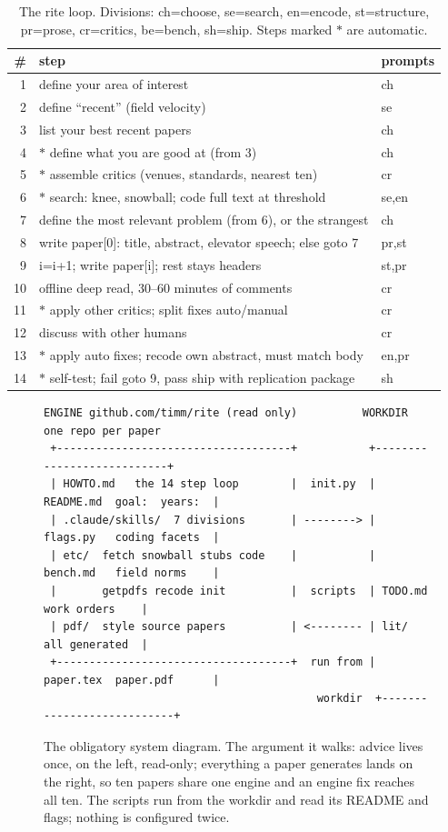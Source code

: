 \begin{table}
\caption{The rite loop. Divisions: ch=choose, se=search,
en=encode, st=structure, pr=prose, cr=critics, be=bench, sh=ship.
Steps marked $\ast$ are automatic.}
\label{tab:loop}
\small
\begin{tabular}{rlp{0.9cm}}
\toprule
\# & step & prompts\\
\midrule
1 & define your area of interest & ch\\
2 & define ``recent'' (field velocity) & se\\
3 & list your best recent papers & ch\\
4 & $\ast$ define what you are good at (from 3) & ch\\
5 & $\ast$ assemble critics (venues, standards,
    nearest ten) & cr\\
6 & $\ast$ search: knee, snowball; code full text
    at threshold & se,en\\
7 & define the most relevant problem (from 6),
    or the strangest & ch\\
8 & write paper[0]: title, abstract, elevator
    speech; else goto 7 & pr,st\\
9 & i=i+1; write paper[i]; rest stays headers & st,pr\\
10 & offline deep read, 30--60 minutes of
    comments & cr\\
11 & $\ast$ apply other critics; split fixes
    auto/manual & cr\\
12 & discuss with other humans & cr\\
13 & $\ast$ apply auto fixes; recode own abstract,
    must match body & en,pr\\
14 & $\ast$ self-test; fail goto 9, pass ship with
    replication package & sh\\
\bottomrule
\end{tabular}
\end{table}

\begin{figure}
\centering
\begin{BVerbatim}[fontsize=\scriptsize]
 ENGINE github.com/timm/rite (read only)          WORKDIR one repo per paper
 +------------------------------------+           +---------------------------+
 | HOWTO.md   the 14 step loop        |  init.py  | README.md  goal:  years:  |
 | .claude/skills/  7 divisions       | --------> | flags.py   coding facets  |
 | etc/  fetch snowball stubs code    |           | bench.md   field norms    |
 |       getpdfs recode init          |  scripts  | TODO.md    work orders    |
 | pdf/  style source papers          | <-------- | lit/       all generated  |
 +------------------------------------+  run from | paper.tex  paper.pdf      |
                                          workdir  +---------------------------+
\end{BVerbatim}
\caption{The obligatory system diagram.
The argument it walks: advice lives once, on the left, read-only;
everything a paper generates lands on the right, so ten papers share
one engine and an engine fix reaches all ten.
The scripts run from the workdir and read its README and flags;
nothing is configured twice.}
\label{fig:sys}
\end{figure}
